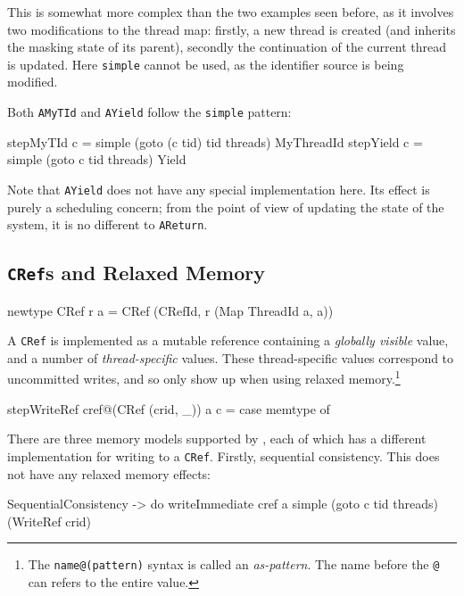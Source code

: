 This is somewhat more complex than the two examples seen before, as it
involves two modifications to the thread map: firstly, a new thread is
created (and inherits the masking state of its parent), secondly the
continuation of the current thread is updated. Here \verb|simple|
cannot be used, as the identifier source is being modified.

Both \verb|AMyTId| and \verb|AYield| follow the \verb|simple| pattern:

\begin{haskellcode}
stepMyTId c = simple (goto (c tid) tid threads) MyThreadId
stepYield c = simple (goto c tid threads) Yield
\end{haskellcode}

Note that \verb|AYield| does not have any special implementation
here. Its effect is purely a scheduling concern; from the point of
view of updating the state of the system, it is no different to
\verb|AReturn|.

\subsection{\texttt{CRef}s and Relaxed Memory}
\label{sec:execution-stepwise-cref}

\begin{haskellcode}
newtype CRef r a = CRef (CRefId, r (Map ThreadId a, a))
\end{haskellcode}

A \verb|CRef| is implemented as a mutable reference containing a
\emph{globally visible} value, and a number of \emph{thread-specific}
values. These thread-specific values correspond to uncommitted writes,
and so only show up when using relaxed memory.\footnote{The
  \texttt{name@(pattern)} syntax is called an \emph{as-pattern}. The
  name before the \texttt{@} can refers to the entire value.}

\begin{haskellcode}
stepWriteRef cref@(CRef (crid, _)) a c = case memtype of
\end{haskellcode}

There are three memory models supported by \dejafu{}, each of which
has a different implementation for writing to a \verb|CRef|. Firstly,
sequential consistency. This does not have any relaxed memory effects:

\begin{haskellcode}
  SequentialConsistency -> do
    writeImmediate cref a
    simple (goto c tid threads) (WriteRef crid)
\end{haskellcode}

